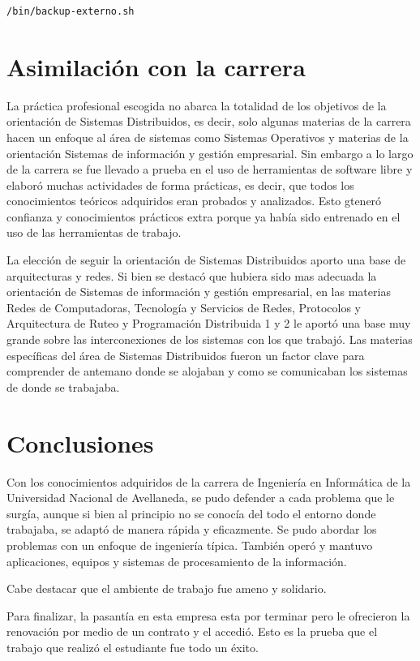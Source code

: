 \documentclass[12pt,a4paper]{article}
\begin{document}
\begin{lstlisting}
/bin/backup-externo.sh
\end{lstlisting}

\section{Asimilación con la carrera}
La práctica profesional escogida no abarca la totalidad de los objetivos de la orientación de Sistemas Distribuidos, es decir, solo algunas materias de la carrera hacen un enfoque al área de sistemas como Sistemas Operativos y materias de la orientación Sistemas de información y gestión empresarial. Sin embargo a lo largo de la carrera se fue llevado a prueba en el uso de herramientas de software libre y elaboró muchas actividades de forma prácticas, es decir, que todos los conocimientos teóricos adquiridos eran probados y analizados. Esto gteneró confianza y conocimientos prácticos extra porque ya había sido entrenado en el uso de las herramientas de trabajo.

La elección de seguir la orientación de Sistemas Distribuidos aporto una base de arquitecturas y redes. Si bien se destacó que hubiera sido mas adecuada la orientación de Sistemas de información y gestión empresarial, en las materias Redes de Computadoras, Tecnología y Servicios de Redes, Protocolos y Arquitectura de Ruteo y Programación Distribuida 1 y 2 le aportó una base muy grande sobre las interconexiones de los sistemas con los que trabajó. Las materias específicas del área de Sistemas Distribuidos fueron un factor clave para comprender de antemano donde se alojaban y como se comunicaban los sistemas de donde se trabajaba.

\section{Conclusiones}
Con los conocimientos adquiridos de la carrera de Ingeniería en Informática de la Universidad Nacional de Avellaneda, se pudo defender a cada problema que le surgía, aunque si bien al principio no se conocía del todo el entorno donde trabajaba, se adaptó de manera rápida y eficazmente. Se pudo abordar los problemas con un enfoque de ingeniería típica. También operó y mantuvo aplicaciones, equipos y sistemas de procesamiento de la información. 

Cabe destacar que el ambiente de trabajo fue ameno y solidario.

Para finalizar, la pasantía en esta empresa esta por terminar pero le ofrecieron la renovación por medio de un contrato y el accedió. Esto es la prueba que el trabajo que realizó el estudiante fue todo un éxito.
\end{document}
